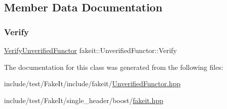 \subsection{Member Data Documentation}
\mbox{\label{classfakeit_1_1UnverifiedFunctor_a6d1008d910bcbc72afba18ea76f7734a}} 
\subsubsection{\texorpdfstring{Verify}{Verify}}
{\footnotesize\ttfamily \mbox{\hyperlink{classfakeit_1_1VerifyUnverifiedFunctor}{Verify\+Unverified\+Functor}} fakeit\+::\+Unverified\+Functor\+::\+Verify}



The documentation for this class was generated from the following files\+:\begin{DoxyCompactItemize}
\item 
include/test/\+Fake\+It/include/fakeit/\mbox{\hyperlink{UnverifiedFunctor_8hpp}{Unverified\+Functor.\+hpp}}\item 
include/test/\+Fake\+It/single\+\_\+header/boost/\mbox{\hyperlink{single__header_2boost_2fakeit_8hpp}{fakeit.\+hpp}}\end{DoxyCompactItemize}
